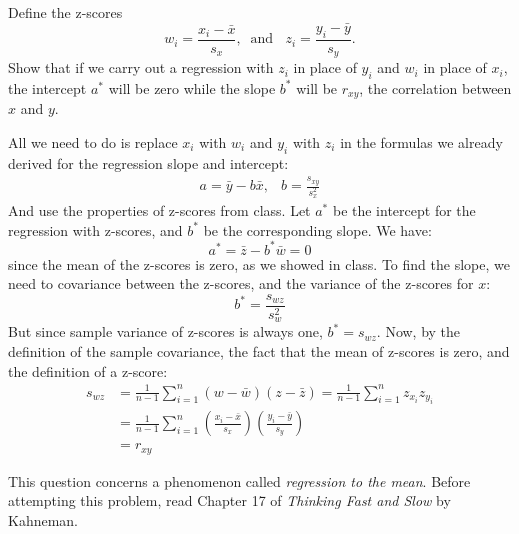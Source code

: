 \documentclass[addpoints,12pt]{exam}\usepackage[]{graphicx}\usepackage[]{xcolor}
\begin{document}
\begin{questions}
  \question Define the z-scores 
  \[w_i = \frac{x_i - \bar{x}}{s_x}, \;\;\mbox{and }\;\; z_i = \frac{y_i - \bar{y}}{s_y}.\]
  Show that if we carry out a regression with $z_i$ in place of $y_i$ and $w_i$ in place of $x_i$, the intercept $a^*$ will be zero while the slope $b^*$ will be $r_{xy}$, the correlation between $x$ and $y$.
    \begin{solution}
     All we need to do is replace $x_i$ with $w_i$ and $y_i$ with $z_i$ in the formulas we already derived for the regression slope and intercept:
     		$$\begin{array}{lr}a = \bar{y} - b\bar{x}, & b = \displaystyle \frac{s_{xy}}{s_x^2}\end{array}$$
     		And use the properties of z-scores from class. Let $a^*$ be the intercept for the regression with z-scores, and $b^*$ be the corresponding slope. We have:
        $$a^* = \bar{z} - b^* \bar{w} = 0$$
     	 	since the mean of the z-scores is zero, as we showed in class. To find the slope, we need to covariance between the z-scores, and the variance of the z-scores for $x$:
     	 		$$b^* = \frac{s_{wz}}{s_{w}^2}$$
     	 		But since sample variance of z-scores is always one, $b^* = s_{wz}$. Now, by the definition of the sample covariance, the fact that the mean of z-scores is zero, and the definition of a z-score:
     	 		\begin{align*}
     	 		s_{wz} &= \frac{1}{n-1} \sum_{i=1}^n (w - \bar{w})(z - \bar{z}) = \frac{1}{n-1} \sum_{i=1}^n z_{x_i}z_{y_i}\\
     	 		&= \frac{1}{n-1} \sum_{i=1}^n \left(\frac{x_i - \bar{x}}{s_x}\right)\left(\frac{y_i - \bar{y}}{s_y}\right)\\
     	 		&= r_{xy}
     	 		\end{align*}
    \end{solution}

  \question This question concerns a phenomenon called \emph{regression to the mean}. Before attempting this problem, read Chapter 17 of \emph{Thinking Fast and Slow} by Kahneman.
  \begin{parts}

\end{parts}
\end{questions}
\end{document}

